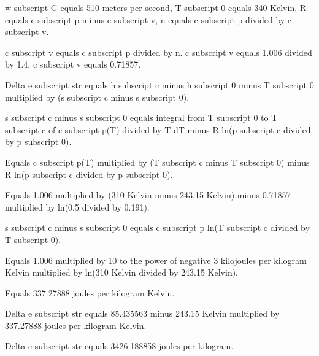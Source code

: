 w subscript G equals 510 meters per second, T subscript 0 equals 340 Kelvin, R equals c subscript p minus c subscript v, n equals c subscript p divided by c subscript v.  

c subscript v equals c subscript p divided by n.  
c subscript v equals 1.006 divided by 1.4.  
c subscript v equals 0.71857.  

Delta e subscript str equals h subscript c minus h subscript 0 minus T subscript 0 multiplied by (s subscript c minus s subscript 0).  

s subscript c minus s subscript 0 equals integral from T subscript 0 to T subscript c of c subscript p(T) divided by T dT minus R ln(p subscript c divided by p subscript 0).  

Equals c subscript p(T) multiplied by (T subscript c minus T subscript 0) minus R ln(p subscript c divided by p subscript 0).  

Equals 1.006 multiplied by (310 Kelvin minus 243.15 Kelvin) minus 0.71857 multiplied by ln(0.5 divided by 0.191).  

s subscript c minus s subscript 0 equals c subscript p ln(T subscript c divided by T subscript 0).  

Equals 1.006 multiplied by 10 to the power of negative 3 kilojoules per kilogram Kelvin multiplied by ln(310 Kelvin divided by 243.15 Kelvin).  

Equals 337.27888 joules per kilogram Kelvin.  

Delta e subscript str equals 85.435563 minus 243.15 Kelvin multiplied by 337.27888 joules per kilogram Kelvin.  

Delta e subscript str equals 3426.188858 joules per kilogram.